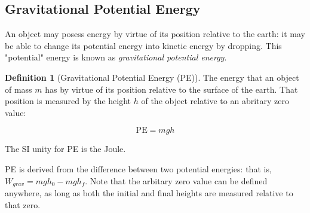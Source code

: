 \documentclass[12pt, a4paper]{article}
\theoremstyle{definition}
\newtheorem{definition}{Definition}
\begin{document}
\subsection{Gravitational Potential Energy}
An object may posess energy by virtue of its position relative to the earth: it may be able to change its potential energy into kinetic energy by dropping.
This "potential" energy is known as \emph{gravitational potential energy}.

\begin{definition}[Gravitational Potential Energy (PE)]
    The energy that an object of mass $m$ has by virtue of its position relative to the surface of the earth. That position is measured by the height $h$ of the object relative to an
    abritary zero value:

    \[\mathrm{PE} = mgh\]

    The SI unity for PE is the Joule.
\end{definition}

PE is derived from the difference between two potential energies: that is, $W_{grav} = mgh_0 - mgh_f$.
Note that the arbitary zero value can be defined anywhere, as long as both the initial and final heights are measured relative to that zero.
\end{document}
